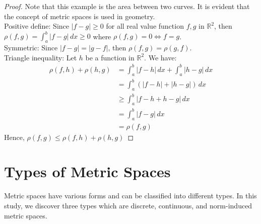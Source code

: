 \documentclass[12pt, reqno]{amsart}
\theoremstyle{definition}
\numberwithin{equation}{section}
\newcommand{\dR}{{\mathbb R}}
\newcommand{\tabb}{\hspace*{1cm}}
\begin{document}
    \begin{proof} Note that this example is the area between two curves. It is evident that the concept of metric spaces is used in geometry.\\
    Positive define: Since $|f-g| \geq 0$ for all real value function $f,g$ in $\dR^2$, then ${\rho(f,g) = \int_{a}^{b} |f-g| \,dx \geq 0}$ where $\rho(f,g) =0 \iff f=g$.\\
    Symmetric: Since $|f-g| = |g-f|$, then $\rho(f,g) = \rho(g,f)$.\\
    Triangle inequality: Let $h$ be a function in $\dR^2$. We have:
        \begin{align*}
        \rho(f, h) + \rho(h, g) &= \int_{a}^{b} |f-h| \,dx + \int_{a}^{b} |h-g| \,dx\\
                                &= \int_{a}^{b} (|f-h|+|h-g|) \,dx\\
                                &\geq \int_{a}^{b} |f-h + h-g| \,dx\\
                                &= \int_{a}^{b} |f-g| \,dx\\
                                &= \rho(f,g)
        \end{align*}
        \tabb Hence, $\rho(f,g) \leq \rho(f, h) + \rho(h, g)$
    \end{proof}
\section{Types of Metric Spaces}
    Metric spaces have various forms and can be classified into different types.  In this study, we discover three types which are discrete, continuous, and norm-induced metric spaces.
\end{document}
